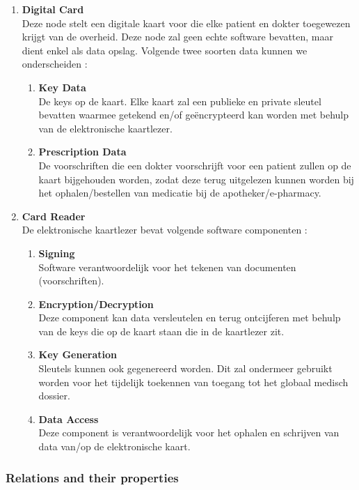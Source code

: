 \documentclass[a4paper,10pt]{book}
\begin{document}
\begin{enumerate}
 \item \textbf{Digital Card}\\
Deze node stelt een digitale kaart voor die elke patient en dokter toegewezen krijgt van de overheid. Deze node zal geen echte software bevatten, maar dient enkel als data opslag. Volgende twee soorten data kunnen we onderscheiden :
\begin{enumerate}
 \item \textbf{Key Data}\\
De keys op de kaart. Elke kaart zal een publieke en private sleutel bevatten waarmee getekend en/of geëncrypteerd kan worden met behulp van de elektronische kaartlezer.
\item \textbf{Prescription Data}\\
De voorschriften die een dokter voorschrijft voor een patient zullen op de kaart bijgehouden worden, zodat deze terug uitgelezen kunnen worden bij het ophalen/bestellen van medicatie bij de apotheker/e-pharmacy.
\end{enumerate}

\item \textbf{Card Reader}\\
De elektronische kaartlezer bevat volgende software componenten : 
\begin{enumerate}
\item \textbf{Signing}\\
Software verantwoordelijk voor het tekenen van documenten (voorschriften).
\item \textbf{Encryption/Decryption}\\
Deze component kan data versleutelen en terug ontcijferen met behulp van de keys die op de kaart staan die in de kaartlezer zit.
\item \textbf{Key Generation}\\
Sleutels kunnen ook gegenereerd worden. Dit zal ondermeer gebruikt worden voor het tijdelijk toekennen van toegang tot het globaal medisch dossier.
\item \textbf{Data Access}\\
Deze component is verantwoordelijk voor het ophalen en schrijven van data van/op de elektronische kaart.
\end{enumerate}

\end{enumerate}


\subsubsection{Relations and their properties}
\end{document}
